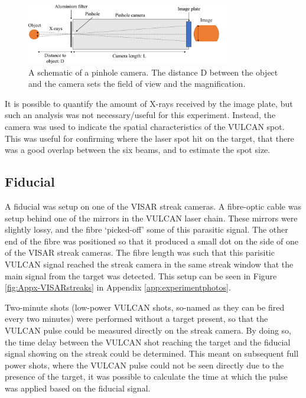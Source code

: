 \begin{figure}
\centering
\includegraphics[width=0.8\textwidth]{figures/Experiment/PinholeTest.pdf}%
\caption{\label{fig:Pinhole schematic} A schematic of a pinhole camera. The distance D between the object and the camera sets the field of view and the magnification.  }
\end{figure}

It is possible to quantify the amount of X-rays received by the image plate, but such an analysis was not necessary/useful for this experiment. Instead, the camera was used to indicate the spatial characteristics of the VULCAN spot. This was useful for confirming where the laser spot hit on the target, that there was a good overlap between the six beams, and to estimate the spot size.

\subsection{Fiducial} \label{Fidu theory}
A fiducial was setup on one of the VISAR streak cameras. A fibre-optic cable was setup behind one of the mirrors in the VULCAN laser chain. These mirrors were slightly lossy, and the fibre `picked-off' some of this parasitic signal. The other end of the fibre was positioned so that it produced a small dot on the side of one of the VISAR streak cameras. The fibre length was such that this parisitic VULCAN signal reached the streak camera in the same streak window that the main signal from the target was detected. This setup can be seen in Figure \ref{fig:Appx-VISARstreaks} in Appendix \ref{app:experimentphotos}.

Two-minute shots (low-power VULCAN shots, so-named as they can be fired every two minutes) were performed without a target present, so that the VULCAN pulse could be measured directly on the streak camera. By doing so, the time delay between the VULCAN shot reaching the target and the fiducial signal showing on the streak could be determined. This meant on subsequent full power shots, where the VULCAN pulse could not be seen directly due to the presence of the target, it was possible to calculate the time at which the pulse was applied based on the fiducial signal.

